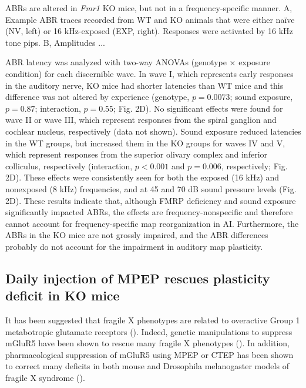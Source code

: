 ABRs are altered in \textit{Fmr1} KO mice, but not in a frequency-specific manner. A, Example ABR traces recorded from WT and KO animals that were either na\"ive (NV, left) or 16 kHz-exposed (EXP, right). Responses were activated by 16 kHz tone pips. B, Amplitudes ...

ABR latency was analyzed with two-way ANOVAs (genotype × exposure condition) for each discernible wave. In wave I, which represents early responses in the auditory nerve, KO mice had shorter latencies than WT mice and this difference was not altered by experience (genotype, $p=0.0073$; sound exposure,$p=0.87$; interaction, $p=0.55$; Fig. 2D). No significant effects were found for wave II or wave III, which represent responses from the spiral ganglion and cochlear nucleus, respectively (data not shown). Sound exposure reduced latencies in the WT groups, but increased them in the KO groups for waves IV and V, which represent responses from the superior olivary complex and inferior colliculus, respectively (interaction, $p<0.001$ and $p=0.006$, respectively; Fig. 2D). These effects were consistently seen for both the exposed (16 kHz) and nonexposed (8 kHz) frequencies, and at 45 and 70 dB sound pressure levels (Fig. 2D). These results indicate that, although FMRP deficiency and sound exposure significantly impacted ABRs, the effects are frequency-nonspecific and therefore cannot account for frequency-specific map reorganization in AI. Furthermore, the ABRs in the KO mice are not grossly impaired, and the ABR differences probably do not account for the impairment in auditory map plasticity.

\subsection{Daily injection of MPEP rescues plasticity deficit in KO mice}

It has been suggested that fragile X phenotypes are related to overactive Group 1 metabotropic glutamate receptors (\cite{Bear2004}). Indeed, genetic manipulations to suppress mGluR5 have been shown to rescue many fragile X phenotypes (\cite{Dolen2007}). In addition, pharmacological suppression of mGluR5 using MPEP or CTEP has been shown to correct many deficits in both mouse and Drosophila melanogaster models of fragile X syndrome (\cite{McBride2005, Yan2005, DeVrij2008, Meredith2011, Su2011, Michalon2012, Thomas2012}).

